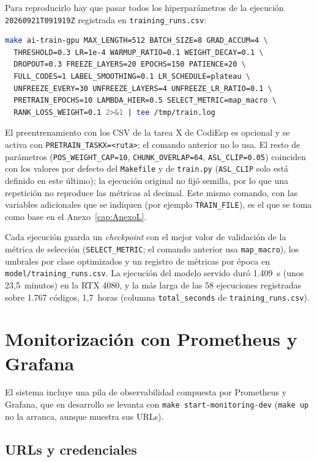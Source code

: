 Para reproducirlo hay que pasar todos los hiperparámetros de la ejecución \texttt{20260921T091919Z} registrada en \texttt{training\_runs.csv}:

\begin{lstlisting}[language=bash, breaklines=true, breakatwhitespace=false]
make ai-train-gpu MAX_LENGTH=512 BATCH_SIZE=8 GRAD_ACCUM=4 \
  THRESHOLD=0.3 LR=1e-4 WARMUP_RATIO=0.1 WEIGHT_DECAY=0.1 \
  DROPOUT=0.3 FREEZE_LAYERS=20 EPOCHS=150 PATIENCE=20 \
  FULL_CODES=1 LABEL_SMOOTHING=0.1 LR_SCHEDULE=plateau \
  UNFREEZE_EVERY=30 UNFREEZE_LAYERS=4 UNFREEZE_LR_RATIO=0.1 \
  PRETRAIN_EPOCHS=10 LAMBDA_HIER=0.5 SELECT_METRIC=map_macro \
  RANK_LOSS_WEIGHT=0.1 2>&1 | tee /tmp/train.log
\end{lstlisting}

El preentrenamiento con los CSV de la tarea X de CodiEsp es opcional y se activa con \texttt{PRETRAIN\_TASKX=<ruta>}; el comando anterior no lo usa. El resto de parámetros (\texttt{POS\_WEIGHT\_CAP=10}, \texttt{CHUNK\_OVERLAP=64}, \texttt{ASL\_CLIP=0.05}) coinciden con los valores por defecto del \texttt{Makefile} y de \texttt{train.py} (\texttt{ASL\_CLIP} solo está definido en este último); la ejecución original no fijó semilla, por lo que una repetición no reproduce las métricas al decimal. Este mismo comando, con las variables adicionales que se indiquen (por ejemplo \texttt{TRAIN\_FILE}), es el que se toma como base en el Anexo~\ref{cap:AnexoL}.

Cada ejecución guarda un \emph{checkpoint} con el mejor valor de validación de la métrica de selección (\texttt{SELECT\_METRIC}; el comando anterior usa \texttt{map\_macro}), los umbrales por clase optimizados y un registro de métricas por época en \texttt{model/training\_runs.csv}. La ejecución del modelo servido duró 1.409~s (unos 23,5~minutos) en la RTX 4080, y la más larga de las 58 ejecuciones registradas sobre 1.767 códigos, 1,7~horas (columna \texttt{total\_seconds} de \texttt{training\_runs.csv}).

\section{Monitorización con Prometheus y Grafana}

El sistema incluye una pila de observabilidad compuesta por Prometheus y Grafana, que en desarrollo se levanta con \texttt{make start-monitoring-dev} (\texttt{make up} no la arranca, aunque muestra sus URLs).

\subsection{URLs y credenciales}


